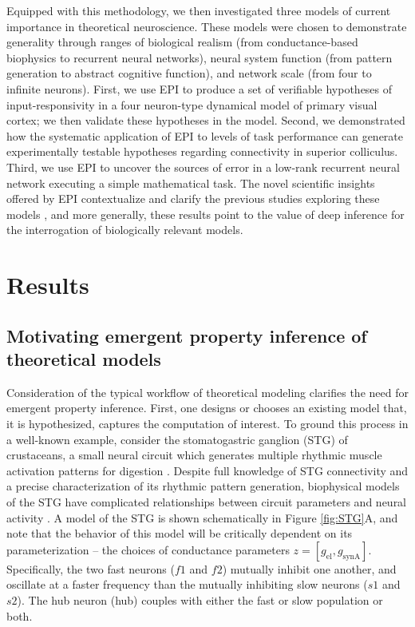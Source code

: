 \documentclass[11pt]{article}
\begin{document}
Equipped with this methodology, we then investigated three models of current importance in theoretical neuroscience.
These models were chosen to demonstrate generality through ranges of biological realism (from conductance-based biophysics to recurrent neural networks), neural system function (from pattern generation to abstract cognitive function), and network scale (from four to infinite neurons).
First, we use EPI to produce a set of verifiable hypotheses of input-responsivity in a four neuron-type dynamical model of primary visual cortex; we then validate these hypotheses in the model.
Second, we demonstrated how the systematic application of EPI to levels of task performance can generate experimentally testable hypotheses regarding connectivity in superior colliculus.  
Third, we use EPI to uncover the sources of error in a low-rank recurrent neural network executing a simple mathematical task.  
The novel scientific insights offered by EPI contextualize and clarify the previous studies exploring these models \cite{gutierrez2013multiple, litwin2016inhibitory, duan2018collicular, mastrogiuseppe2018linking}, and more generally, these results point to the value of deep inference for the interrogation of biologically relevant models.



\section{Results}
\subsection{Motivating emergent property inference of theoretical models} \label{results_motivating}

Consideration of the typical workflow of theoretical modeling clarifies the need for emergent property inference.  
First, one designs or chooses an existing model that, it is hypothesized, captures the computation of interest. 
To ground this process in a well-known example, consider the stomatogastric ganglion (STG) of crustaceans, a small neural circuit which generates multiple rhythmic muscle activation patterns for digestion \cite{marder2002cellular}.
Despite full knowledge of STG connectivity and a precise characterization of its rhythmic pattern generation, biophysical models of the STG have complicated relationships between circuit parameters and neural activity \cite{goldman2001global, prinz2004similar}.
A model of the STG \cite{gutierrez2013multiple} is shown schematically in Figure \ref{fig:STG}A, and note that the behavior of this model will be critically dependent on its parameterization -- the choices of conductance parameters $z = [g_{\text{el}}, g_{\text{synA}}]$.
Specifically, the two fast neurons ($f1$ and $f2$) mutually inhibit one another, and oscillate at a faster frequency than the mutually inhibiting slow neurons ($s1$ and $s2$).  The hub neuron (hub) couples with either the fast or slow population or both.  
\end{document}
